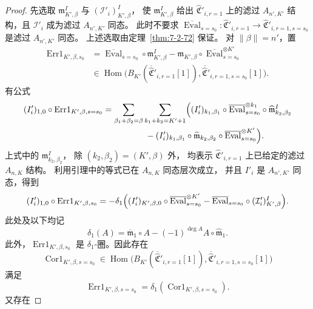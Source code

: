 \begin{proof}
先选取 $\mathfrak m^I_{K',\beta}$ 与
$(\mathcal I'_i)^I_{K',\beta}$，
使 $\mathfrak m^I_{K',\beta}$ 给出
$\widehat{\mathfrak C}'_{i,r=1}$ 上的滤过
$A_{n',K'}$ 结构，且 $\mathcal I'_i$
成为滤过 $A_{n',K'}$ 同态。
此时不要求
$\overline{\operatorname{Eval}}_{s=s_0}\colon
\widehat{\mathfrak C}'_{i,r=1}
\to\widehat{\mathfrak C}'_{i,r=1,s=s_0}$
是滤过 $A_{n',K'}$ 同态。
上述选取由定理~\ref{thm:7-2-72} 保证。
对 $\lVert\beta\rVert=n'$，置
\[
\begin{aligned}
\operatorname{Err1}_{K',\beta,s_0}
&=\overline{\operatorname{Eval}}_{s=s_0}
\circ\mathfrak m^I_{K',\beta}
-\mathfrak m_{K',\beta}\circ
\overline{\operatorname{Eval}}_{s=s_0}^{\otimes K'}\\
&\in\operatorname{Hom}\bigl(
B_{K'}(\overline{\widehat{\mathfrak C}}'_{i,r=1}[1]),
\overline{\widehat{\mathfrak C}}'_{i,r=1,s=s_0}[1]
\bigr).
\end{aligned}
\]
有公式
\[
\begin{aligned}
(I'_i)_{1,0}\circ\operatorname{Err1}_{K',\beta,s=s_0}
&=\sum_{\beta_1+\beta_2=\beta}
\sum_{k_1+k_2=K'+1}
\Bigl((I'_i)_{k_1,\beta_1}\circ
\overline{\operatorname{Eval}}_{s=s_0}^{\otimes k_1}
\circ\widehat{\mathfrak m}^{I}_{k_2,\beta_2}\\
&\hspace{5em}-(I'_i)_{k_1,\beta_1}\circ
\widehat{\mathfrak m}_{k_2,\beta_2}
\circ\overline{\operatorname{Eval}}_{s=s_0}^{\otimes K'}
\Bigr).
\end{aligned}
\]
上式中的 $\mathfrak m^I_{k_2,\beta_2}$，
除 $(k_2,\beta_2)=(K',\beta)$ 外，
均表示 $\widehat{\mathfrak C}'_{i,r=1}$
上已给定的滤过 $A_{n,K}$ 结构。
利用引理中的等式已在 $A_{n,K}$ 同态层次成立，
并且 $I'_i$ 是 $A_{n',K'}$ 同态，得到
\[
\begin{aligned}
(I'_i)_{1,0}\circ\operatorname{Err1}_{K',\beta,s_0}
=-\delta_1\Bigl(
(I'_i)_{K',\beta,0}\circ
\overline{\operatorname{Eval}}_{s=s_0}^{\otimes K'}
-\overline{\operatorname{Eval}}_{s=s_0}\circ
(\mathcal I'_i)^I_{K',\beta}
\Bigr).
\end{aligned}
\]
此处及以下均记
\[
\delta_1(A)=\overline{\mathfrak m}_1\circ A
-(-1)^{\deg A}A\circ\widehat{\mathfrak m}_1.
\]
此外，$\operatorname{Err1}_{K',\beta,s_0}$
是 $\delta_1$-圈。因此存在
\[
\operatorname{Cor1}_{K',\beta,s=s_0}
\in\operatorname{Hom}\bigl(
B_{K'}(\overline{\widehat{\mathfrak C}}'_{i,r=1}[1]),
\overline{\widehat{\mathfrak C}}'_{i,r=1,s=s_0}[1]
\bigr)
\]
满足
\[
\operatorname{Err1}_{K',\beta,s=s_0}
=\delta_1(\operatorname{Cor1}_{K',\beta,s=s_0}).
\]
又存在

\end{proof}
